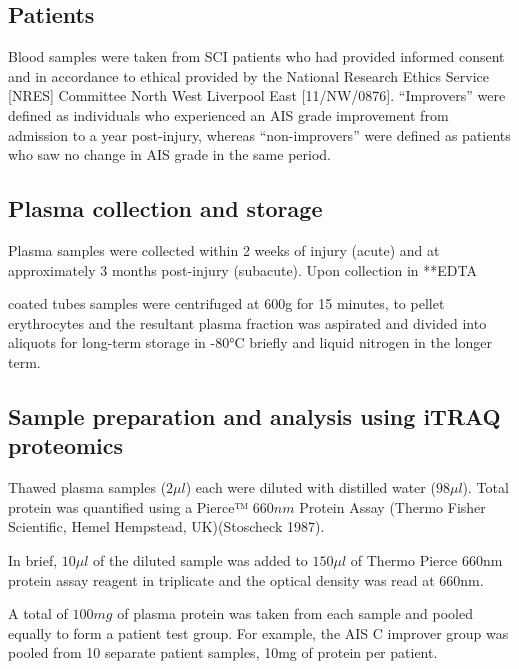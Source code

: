 \documentclass[9pt,lineno]{elife}
\begin{document}
\hypertarget{patients}{%
\subsection{Patients}\label{patients}}

Blood samples were taken from SCI patients who had provided informed consent and in accordance to ethical provided by the National Research Ethics Service {[}NRES{]} Committee North West Liverpool East {[}11/NW/0876{]}. ``Improvers'' were defined as individuals who experienced an AIS grade improvement from admission to a year post-injury, whereas ``non-improvers'' were defined as patients who saw no change in AIS grade in the same period.

\hypertarget{plasma-collection-and-storage}{%
\subsection{Plasma collection and storage}\label{plasma-collection-and-storage}}

Plasma samples were collected within 2 weeks of injury (acute) and at approximately 3 months post-injury (subacute). Upon collection in **EDTA

coated tubes samples were centrifuged at 600g for 15 minutes, to pellet erythrocytes and the resultant plasma fraction was aspirated and divided into aliquots for long-term storage in -80°C briefly and liquid nitrogen in the longer term.

\hypertarget{itraq-sample-prep}{%
\subsection{Sample preparation and analysis using iTRAQ proteomics}\label{itraq-sample-prep}}

Thawed plasma samples (\(2\mu l\)) each were diluted with distilled water (\(98\mu l\)). Total protein was quantified using a Pierce™ \(660 nm\) Protein Assay (Thermo Fisher Scientific, Hemel Hempstead, UK)(Stoscheck 1987).

In brief, \(10\mu l\) of the diluted sample was added to \(150\mu l\) of Thermo Pierce 660nm protein assay reagent in triplicate and the optical density was read at 660nm.

A total of \(100 mg\) of plasma protein was taken from each sample and pooled equally to form a patient test group.
For example, the AIS C improver group was pooled from 10 separate patient samples, 10mg of protein per patient.
\end{document}

